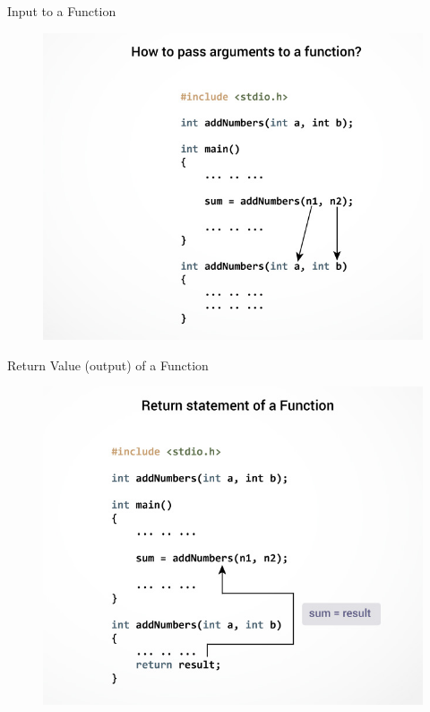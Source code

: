 \begin{frame}[fragile]{Input to a Function}{}
\begin{figure}
    \begin{center}
        \includegraphics[width=0.8\linewidth]{images/func_args.jpg}
    \end{center}
\end{figure}
\end{frame}

\begin{frame}[fragile]{Return Value (output) of a Function}{}
\begin{figure}
    \begin{center}
        \includegraphics[width=0.8\linewidth]{images/func_return.jpg}
    \end{center}
\end{figure}
\end{frame}

